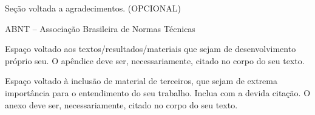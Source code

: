 \documentclass[12pt]{article}
\begin{document}

\makecapa
\makefolhaderosto

\makefolhadeaprovacao

\newpage

\setcounter{page}{4}

Seção voltada a agradecimentos. (OPCIONAL)
\newpage


\newpage

\listoffigures
\newpage

\listoftables
\newpage

\noindent ABNT -- Associação Brasileira de Normas Técnicas
\newpage

\tableofcontents
\newpage



\clearpage

\clearpage

\clearpage

\clearpage

\clearpage

\printbibliography[title={REFERÊNCIAS}, heading=bibintoc]
\newpage

\label{ap:exemplo}
Espaço voltado aos textos/resultados/materiais que sejam de desenvolvimento próprio seu.
O apêndice deve ser, necessariamente, citado no corpo do seu texto.
\newpage

\label{an:exemplo}
Espaço voltado à inclusão de material de terceiros, que sejam de extrema importância para o entendimento do seu trabalho.
Inclua com a devida citação.
O anexo deve ser, necessariamente, citado no corpo do seu texto.
\end{document}
